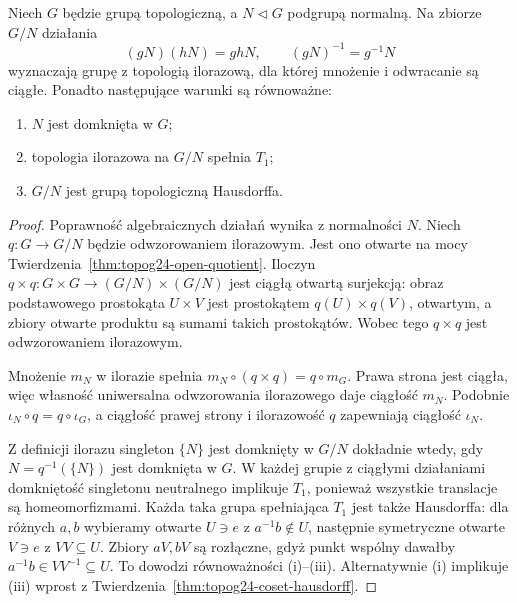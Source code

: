 \begin{twierdzenie}
\label{thm:topog24-normal-quotient}
Niech \(G\) będzie grupą topologiczną,
a \(N\triangleleft G\) podgrupą normalną.
Na zbiorze \(G/N\) działania
\[
 (gN)(hN)=ghN,\qquad (gN)^{-1}=g^{-1}N
\]
wyznaczają grupę z topologią ilorazową,
dla której mnożenie i odwracanie
są ciągłe. Ponadto następujące
warunki są równoważne:
\begin{enumerate}[label=\textup{(\roman*)}]
\item \(N\) jest domknięta w \(G\);
\item topologia ilorazowa na \(G/N\) spełnia \(T_1\);
\item \(G/N\) jest grupą topologiczną Hausdorffa.
\end{enumerate}
\end{twierdzenie}
\begin{proof}
Poprawność algebraicznych działań
wynika z normalności \(N\).
Niech \(q\colon G\to G/N\)
będzie odwzorowaniem ilorazowym.
Jest ono otwarte na mocy
Twierdzenia~\ref{thm:topog24-open-quotient}.
Iloczyn \(q\times q\colon
G\times G\to(G/N)\times(G/N)\)
jest ciągłą otwartą surjekcją:
obraz podstawowego prostokąta
\(U\times V\) jest prostokątem
\(q(U)\times q(V)\), otwartym,
a zbiory otwarte produktu są sumami
takich prostokątów. Wobec tego
\(q\times q\) jest odwzorowaniem ilorazowym.

Mnożenie \(m_N\) w ilorazie
spełnia \(m_N\circ(q\times q)=q\circ m_G\).
Prawa strona jest ciągła,
więc własność uniwersalna odwzorowania
ilorazowego daje ciągłość \(m_N\).
Podobnie \(\iota_N\circ q=q\circ\iota_G\),
a ciągłość prawej strony
i ilorazowość \(q\) zapewniają
ciągłość \(\iota_N\).

Z definicji ilorazu
singleton \(\{N\}\) jest domknięty
w \(G/N\) dokładnie wtedy,
gdy \(N=q^{-1}(\{N\})\)
jest domknięta w \(G\).
W każdej grupie z ciągłymi działaniami
domkniętość singletonu neutralnego
implikuje \(T_1\), ponieważ
wszystkie translacje są homeomorfizmami.
Każda taka grupa spełniająca \(T_1\)
jest także Hausdorffa:
dla różnych \(a,b\) wybieramy
otwarte \(U\ni e\) z \(a^{-1}b\notin U\),
następnie symetryczne otwarte \(V\ni e\)
z \(VV\subseteq U\).
Zbiory \(aV,bV\) są rozłączne,
gdyż punkt wspólny dawałby
\(a^{-1}b\in VV^{-1}\subseteq U\).
To dowodzi równoważności
\textup{(i)}--\textup{(iii)}.
Alternatywnie \textup{(i)} implikuje
\textup{(iii)} wprost z
Twierdzenia~\ref{thm:topog24-coset-hausdorff}.
\end{proof}

